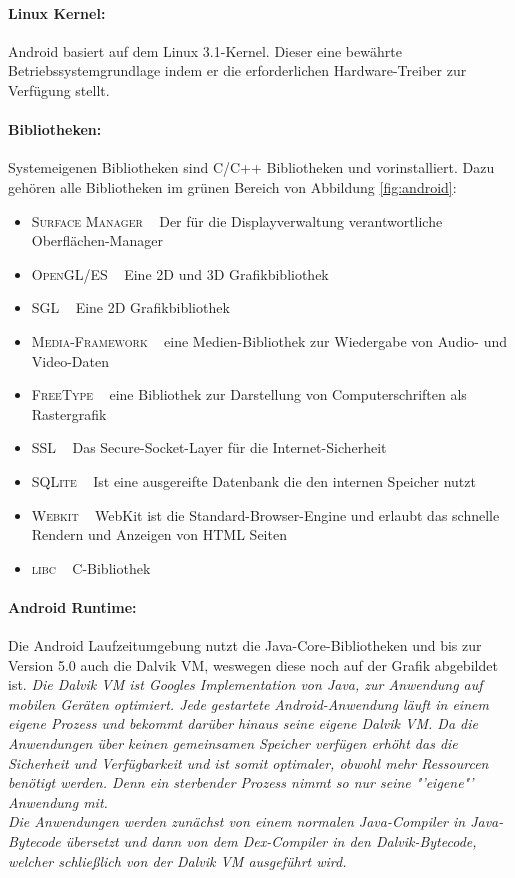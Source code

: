 \paragraph{Linux Kernel: }
Android basiert auf dem Linux 3.1-Kernel. Dieser eine bewährte Betriebssystemgrundlage indem er die erforderlichen Hardware-Treiber zur Verfügung stellt.
\paragraph{Bibliotheken: }
Systemeigenen Bibliotheken sind C/C++ Bibliotheken und vorinstalliert. Dazu gehören alle Bibliotheken im grünen Bereich von Abbildung \ref{fig:android}:
\begin{itemize}[leftmargin=0.7cm]
\renewcommand\labelitemi{--}
	\item \textsc{Surface Manager} ~ Der für die Displayverwaltung verantwortliche Oberflächen-Manager
	\item \textsc{OpenGL/ES} ~ Eine 2D und 3D Grafikbibliothek
	\item \textsc{SGL} ~ Eine 2D Grafikbibliothek
 	\item \textsc{Media-Framework} ~ eine Medien-Bibliothek zur Wiedergabe von Audio- und Video-Daten 	
 	\item \textsc{FreeType} ~ eine Bibliothek zur Darstellung von Computerschriften als Rastergrafik
 	\item \textsc{SSL} ~ Das Secure-Socket-Layer für die Internet-Sicherheit
	\item \textsc{SQLite} ~ Ist eine ausgereifte Datenbank die den internen Speicher nutzt 
	\item \textsc{Webkit} ~ WebKit ist die Standard-Browser-Engine und erlaubt das schnelle Rendern und Anzeigen von HTML Seiten
	\item \textsc{libc} ~ C-Bibliothek
\end{itemize}
\paragraph{Android Runtime: }
Die Android Laufzeitumgebung nutzt die Java-Core-Bibliotheken und bis zur Version 5.0 auch die Dalvik \gls{VM}, weswegen diese noch auf der Grafik abgebildet ist.  
\textit{Die Dalvik \gls{VM} ist Googles Implementation von Java, zur Anwendung auf mobilen Geräten optimiert. Jede gestartete Android-Anwendung läuft in einem eigene Prozess und bekommt darüber hinaus seine eigene Dalvik \gls{VM}. Da die Anwendungen über keinen gemeinsamen Speicher verfügen erhöht das die Sicherheit und Verfügbarkeit und ist somit optimaler, obwohl mehr Ressourcen benötigt werden. Denn ein sterbender Prozess nimmt so nur seine "'eigene"' Anwendung mit. \\ 
Die Anwendungen werden zunächst von einem normalen Java-Compiler in Java-Bytecode übersetzt und dann von dem Dex-Compiler in den Dalvik-Bytecode, welcher schließlich von der Dalvik \gls{VM} ausgeführt wird. \cite{android_art}}
